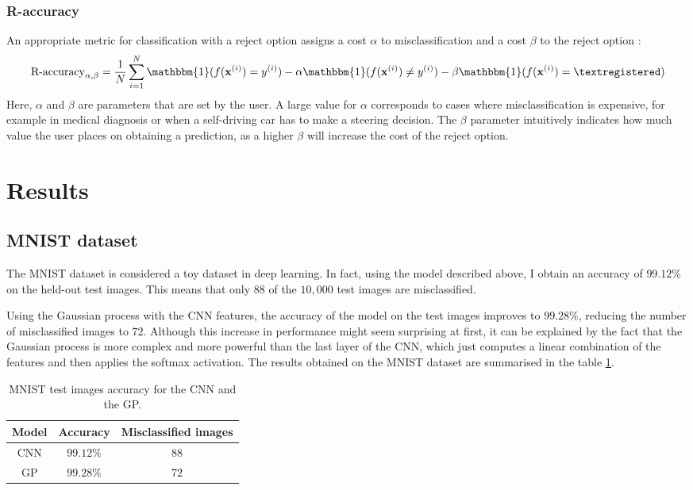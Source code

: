 \documentclass{article}
\begin{document}
\subsubsection{R-accuracy}
 An appropriate metric for classification with a reject option assigns a cost $\alpha$ to misclassification and a cost $\beta$ to the reject option \textregistered:
\begin{equation*}
	\textrm{R-accuracy}_{\alpha, \beta} = \frac{1}{N} \sum_{i=1}^N \mathbbm{1}(f(\mathbf{x}^{(i)}) = y^{(i)}) - \alpha \mathbbm{1}(f(\mathbf{x}^{(i)}) \neq y^{(i)}) - \beta \mathbbm{1}(f(\mathbf{x}^{(i)}) = \textregistered)
\end{equation*}
Here, $\alpha$ and $\beta$ are parameters that are set by the user. A large value for $\alpha$ corresponds to cases where misclassification is expensive, for example in medical diagnosis or when a self-driving car has to make a steering decision. The $\beta$ parameter intuitively indicates how much value the user places on obtaining a prediction, as a higher $\beta$ will increase the cost of the reject option.

\section{Results}
\subsection{MNIST dataset}
The MNIST dataset is considered a toy dataset in deep learning. In fact, using the model described above, I obtain an accuracy of $99.12\%$ on the held-out test images. This means that only $88$ of the $10,000$ test images are misclassified.

Using the Gaussian process with the CNN features, the accuracy of the model on the test images improves to $99.28\%$, reducing the number of misclassified images to $72$. Although this increase in performance might seem surprising at first, it can be explained by the fact that the Gaussian process is more complex and more powerful than the last layer of the CNN, which just computes a linear combination of the features and then applies the softmax activation. The results obtained on the MNIST dataset are summarised in the table \ref{table/mnist_acc}.

\begin{table}[h]
\centering	
{\renewcommand{\arraystretch}{1.4} %
\begin{tabular}{ c | c c}
\textbf{Model} & \textbf{Accuracy} & \textbf{Misclassified images}\\
\hline
CNN & $99.12\%$ & $88$ \\
GP & $99.28\%$  & $72$\\
\end{tabular}
}
\caption{MNIST test images accuracy for the CNN and the GP.}
\label{table/mnist_acc}
\end{table}
\end{document}

